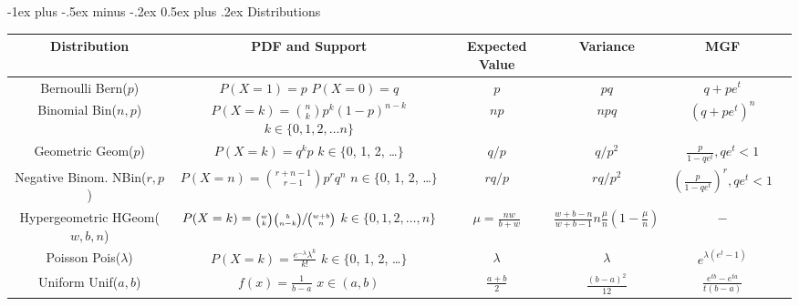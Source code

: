 \documentclass[10pt,landscape]{article}
\makeatletter
\newcommand{\Bern}{\textrm{Bern}}
\newcommand{\Bin}{\textrm{Bin}}
\newcommand{\Pois}{\textrm{Pois}}
\newcommand{\Unif}{\textrm{Unif}}
\newcommand{\Geom}{\textrm{Geom}}
\newcommand{\NBin}{\textrm{NBin}}
\newcommand{\Hypergeometric}{\textrm{HGeom}}
\renewcommand{\section}{\@startsection{section}{1}{0mm}%
                                {-1ex plus -.5ex minus -.2ex}%
                                {0.5ex plus .2ex}%
                                {\normalfont\large\bfseries}}
\makeatother
\begin{document}
\begin{center}

\section{Distributions}

\renewcommand{\arraystretch}{3}
\begin{tabular}{cccccc}
\textbf{Distribution} & \textbf{PDF and Support} & \textbf{Expected Value}  & \textbf{Variance} & \textbf{MGF}\\
\hline \hline
\shortstack{Bernoulli \\ \Bern($p$)} & \shortstack{$P(X=1) = p$ \\$ P(X=0) = q$} & $p$ & $pq$ & $q + pe^t$ \\
\hline
\shortstack{Binomial \\ \Bin($n, p$)} & \shortstack{$P(X=k) = {n \choose k}p^k(1-p)^{n-k}$  \\ $k \in \{0, 1, 2, \dots n\}$}& $np$ & $npq$ & $(q + pe^t)^n$ \\
\hline
\shortstack{Geometric \\ \Geom($p$)} & \shortstack{$P(X=k) = q^kp$  \\ $k \in \{$0, 1, 2, \dots $\}$}& $q/p$ & $q/p^2$ & $\frac{p}{1-qe^t}, qe^t < 1$\\
\hline
\shortstack{Negative Binom. \\ \NBin($r, p$)} & \shortstack{$P(X=n) = {r + n - 1 \choose r -1}p^rq^n$ \\ $n \in \{$0, 1, 2, \dots $\}$} & $rq/p$ & $rq/p^2$ &  $(\frac{p}{1-qe^t})^r, qe^t < 1$\\
\hline
\shortstack{Hypergeometric \\ \Hypergeometric($w, b, n$)} & \shortstack{$P(X=k) = \sfrac{{w \choose k}{b \choose n-k}}{{w + b \choose n}}$ \\ $k \in \{0, 1, 2, \dots,  n\}$} & $\mu = \frac{nw}{b+w}$ &$\frac{w+b-n}{w+b-1}n\frac{\mu}{n}(1 - \frac{\mu}{n})$& $-$  \\
\hline
\shortstack{Poisson \\ \Pois($\lambda$)} & \shortstack{$P(X=k) = \frac{e^{-\lambda}\lambda^k}{k!}$ \\ $k \in \{$0, 1, 2, \dots $\}$} & $\lambda$ & $\lambda$ & $e^{\lambda(e^t-1)}$ \\
\hline
\hline
\shortstack{Uniform \\ \Unif($a, b$)} & \shortstack{$ f(x) = \frac{1}{b-a}$ \\$ x \in (a, b) $} & $\frac{a+b}{2}$ & $\frac{(b-a)^2}{12}$ &  $\frac{e^{tb}-e^{ta}}{t(b-a)}$\\

\end{tabular}
\end{center}
\end{document}
